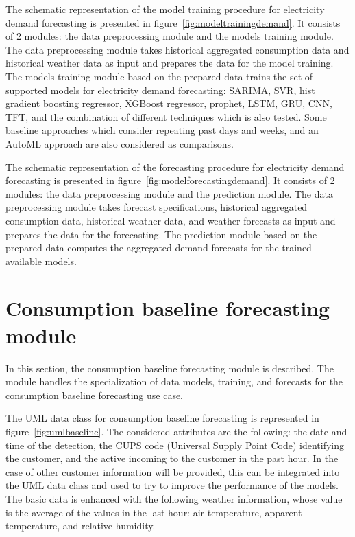 The schematic representation of the model training procedure for electricity demand forecasting is presented in figure~\ref{fig:modeltrainingdemand}.
It consists of 2 modules: the data preprocessing module and the models training module.
The data preprocessing module takes historical aggregated consumption data and historical weather data as input and prepares the data for the model training.
The models training module based on the prepared data trains the set of supported models for electricity demand forecasting: SARIMA, SVR, hist gradient boosting regressor, XGBoost regressor, prophet, LSTM, GRU, CNN, TFT, and the combination of different techniques which is also tested.
Some baseline approaches which consider repeating past days and weeks, and an AutoML approach are also considered as comparisons.

The schematic representation of the forecasting procedure for electricity demand forecasting is presented in figure~\ref{fig:modelforecastingdemand}.
It consists of 2 modules: the data preprocessing module and the prediction module.
The data preprocessing module takes forecast specifications, historical aggregated consumption data, historical weather data, and weather forecasts as input and prepares the data for the forecasting.
The prediction module based on the prepared data computes the aggregated demand forecasts for the trained available models.


\section{Consumption baseline forecasting module}
\label{sec:baselinemodel}
\vspace{0.2 cm}

In this section, the consumption baseline forecasting module is described.
The module handles the specialization of data models, training, and forecasts for the consumption baseline forecasting use case.

The UML data class for consumption baseline forecasting is represented in figure~\ref{fig:umlbaseline}.
The considered attributes are the following: the date and time of the detection, the CUPS code (Universal Supply Point Code) identifying the customer, and the active incoming to the customer in the past hour.
In the case of other customer information will be provided, this can be integrated into the UML data class and used to try to improve the performance of the models.
The basic data is enhanced with the following weather information, whose value is the average of the values in the last hour: air temperature, apparent temperature, and relative humidity.

